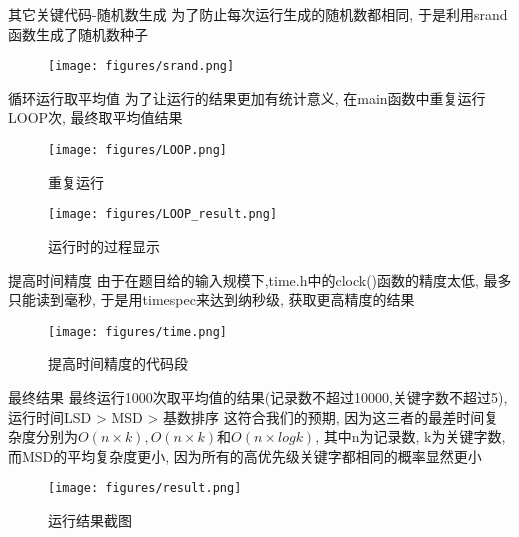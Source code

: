 \documentclass{beamer}
\begin{document}
\begin{frame}{其它关键代码-随机数生成}
  为了防止每次运行生成的随机数都相同, 于是利用srand函数生成了随机数种子
  \begin{figure}
    \centering
    \texttt{[image: figures/srand.png]}
  \end{figure}
\end{frame}

\begin{frame}{循环运行取平均值}
  为了让运行的结果更加有统计意义, 在main函数中重复运行LOOP次, 最终取平均值结果
  \begin{figure}
    \centering
    \begin{minipage}[b]{0.49\linewidth}
      \centering
      \texttt{[image: figures/LOOP.png]}
      \caption*{重复运行}
    \end{minipage}
    \begin{minipage}[b]{0.49\linewidth}
      \centering
      \texttt{[image: figures/LOOP\_result.png]}
      \caption*{运行时的过程显示}
    \end{minipage}
  \end{figure}
\end{frame}

\begin{frame}{提高时间精度}
  由于在题目给的输入规模下,time.h中的clock()函数的精度太低, 最多只能读到毫秒, 于是用timespec来达到纳秒级, 获取更高精度的结果
  \begin{figure}
    \centering
    \texttt{[image: figures/time.png]}
    \caption*{提高时间精度的代码段}
  \end{figure}
\end{frame}

\begin{frame}{最终结果}
  最终运行1000次取平均值的结果(记录数不超过10000,关键字数不超过5), 运行时间LSD > MSD > 基数排序
  这符合我们的预期, 因为这三者的最差时间复杂度分别为$O(n\times k), O(n\times k)和O(n\times logk)$, 其中n为记录数, k为关键字数,
  而MSD的平均复杂度更小, 因为所有的高优先级关键字都相同的概率显然更小
  \begin{figure}
    \centering
    \texttt{[image: figures/result.png]}
    \caption*{运行结果截图}
  \end{figure}
\end{frame}
\end{document}
